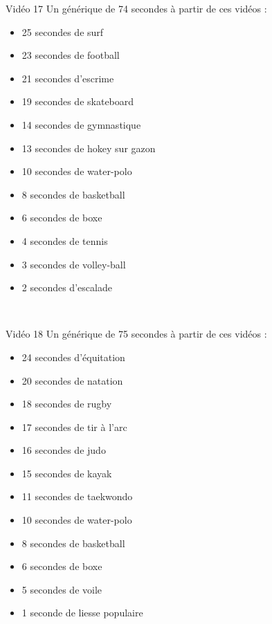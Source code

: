 \documentclass[10pt, a5paper,twoside]{article}
\begin{document}
\begin{card}[width = \textwidth, colback = olympicgreen, colframe = olympicgreen, bottomtitle = 2mm]{Vidéo 17}
  Un générique de 74 secondes à partir de ces vidéos :
  \vspace{-1mm}\begin{itemize}
    \item 25 secondes de surf
    \item 23 secondes de football
    \item 21 secondes d'escrime
    \item 19 secondes de skateboard
    \item 14 secondes de gymnastique
    \item 13 secondes de hokey sur gazon
    \item 10 secondes de water-polo
    \item 8 secondes de basketball
    \item 6 secondes de boxe
    \item 4 secondes de tennis
    \item 3 secondes de volley-ball
    \item 2 secondes d'escalade
  \end{itemize}
\end{card}

\vfill

\clearpage
~
\vfill

\begin{card}[width = \textwidth, colback = olympicgreen, colframe = olympicgreen, bottomtitle = 2mm]{Vidéo 18}
  Un générique de 75 secondes à partir de ces vidéos :
  \vspace{-1mm}\begin{itemize}
    \item 24 secondes d'équitation
    \item 20 secondes de natation
    \item 18 secondes de rugby
    \item 17 secondes de tir à l'arc
    \item 16 secondes de judo
    \item 15 secondes de kayak
    \item 11 secondes de taekwondo
    \item 10 secondes de water-polo
    \item 8 secondes de basketball
    \item 6 secondes de boxe
    \item 5 secondes de voile
    \item 1 seconde de liesse populaire
  \end{itemize}
\end{card}
\end{document}
